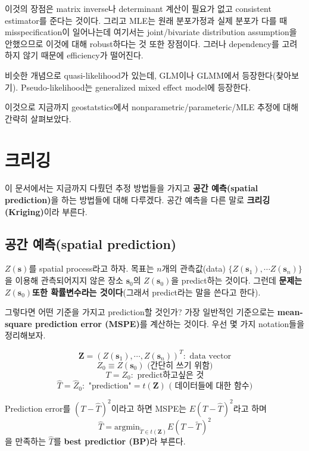 \documentclass[b5paper,]{book}
\theoremstyle{definition}
\theoremstyle{definition}
\theoremstyle{definition}
\theoremstyle{remark}
\begin{document}
이것의 장점은 matrix inverse나 determinant 계산이 필요가 없고 consistent
estimator를 준다는 것이다. 그리고 MLE는 원래 분포가정과 실제 분포가 다를
때 misspecification이 일어나는데 여기서는 joint/bivariate distribution
assumption을 안했으므로 이것에 대해 robust하다는 것 또한 장점이다.
그러나 dependency를 고려하지 않기 때문에 efficiency가 떨어진다.

비슷한 개념으로 quasi-likelihood가 있는데, GLM이나 GLMM에서
등장한다(찾아보기). Pseudo-likelihood는 generalized mixed effect model에
등장한다.

이것으로 지금까지 geostatstics에서 nonparametric/parameteric/MLE 추정에
대해 간략히 살펴보았다.

\chapter{크리깅}\label{kriging}

이 문서에서는 지금까지 다뤘던 추정 방법들을 가지고 \textbf{공간
예측(spatial prediction)}을 하는 방법들에 대해 다루겠다. 공간 예측을
다른 말로 \textbf{크리깅(Kriging)}이라 부른다.

\section{공간 예측(spatial prediction)}\label{-spatial-prediction}

\(Z(\mathbf{s})\)를 spatial process라고 하자. 목표는 \(n\)개의
관측값(data) \(\{ Z(\mathbf{s}_{1}), \cdots Z(\mathbf{s}_{n}) \}\)을
이용해 관측되어지지 않은 장소 \(\mathbf{s}_{0}\)의
\(Z(\mathbf{s}_{0})\)을 predict하는 것이다. 그런데 \textbf{문제는
\(Z(\mathbf{s}_{0})\)또한 확률변수라는 것이다}(그래서 predict라는 말을
쓴다고 한다).

그렇다면 어떤 기준을 가지고 prediction할 것인가? 가장 일반적인
기준으로는 \textbf{mean-square prediction error (MSPE)}를 계산하는
것이다. 우선 몇 가지 notation들을 정리해보자.

\[\mathbf{Z}=(Z(\mathbf{s}_{1}), \cdots , Z(\mathbf{s}_{n}))^{T}: \text{ data vector}\]
\[Z_{0}\equiv Z(\mathbf{s}_{0}) \text{ (간단히 쓰기 위함)}\]
\[T=Z_{0}: \text{ predict하고싶은 것}\]
\[\hat{T}=\hat{Z}_{0}: \text{ "prediction"}=t(\mathbf{Z}) \text{ ( 데이터들에 대한 함수)}\]

Prediction error를 \((T-\hat{T})^{2}\)이라고 하면 MSPE는
\(E(T-\hat{T})^{2}\)라고 하며
\[\hat{T}=\text{argmin}_{\tilde{T}\in t(\mathbf{Z})}E(T-\tilde{T})^{2}\]
을 만족하는 \(\hat{T}\)를 \textbf{best predictior (BP)}라 부른다.
\end{document}
